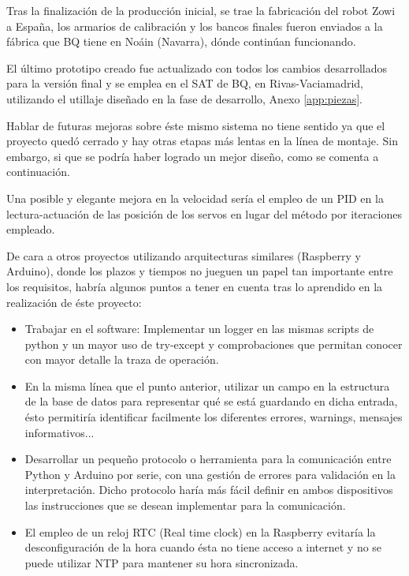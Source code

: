 Tras la finalización de la producción inicial, se trae la fabricación del robot Zowi a España, los armarios de calibración y los bancos finales fueron enviados a la fábrica que BQ tiene en Noáin (Navarra), dónde continúan funcionando.

El último prototipo creado fue actualizado con todos los cambios desarrollados para la versión final y se emplea en el SAT de BQ, en Rivas-Vaciamadrid, utilizando el utillaje diseñado en la fase de desarrollo, Anexo \ref{app:piezas}.

Hablar de futuras mejoras sobre éste mismo sistema no tiene sentido ya que el proyecto quedó cerrado y hay otras etapas más lentas en la línea de montaje. Sin embargo, si que se podría haber logrado un mejor diseño, como se comenta a continuación.

Una posible y elegante mejora en la velocidad sería el empleo de un PID en la lectura-actuación de las posición de los servos en lugar del método por iteraciones empleado.

De cara a otros proyectos utilizando arquitecturas similares (Raspberry y Arduino), donde los plazos y tiempos no jueguen un papel tan importante entre los requisitos, habría algunos puntos a tener en cuenta tras lo aprendido en la realización de éste proyecto:

\begin{itemize}
  \item Trabajar en el software: Implementar un logger en las mismas scripts de python y un mayor uso de try-except y comprobaciones que permitan conocer con mayor detalle la traza de operación.
  \item En la misma línea que el punto anterior, utilizar un campo en la estructura de la base de datos para representar qué se está guardando en dicha entrada, ésto permitiría identificar facilmente los diferentes errores, warnings, mensajes informativos...
  \item Desarrollar un pequeño protocolo o herramienta para la comunicación entre Python y Arduino por serie, con una gestión de errores para validación en la interpretación. Dicho protocolo haría más fácil definir en ambos dispositivos las instrucciones que se desean implementar para la comunicación.
  \item El empleo de un reloj RTC (Real time clock) en la Raspberry evitaría la desconfiguración de la hora cuando ésta no tiene acceso a internet y no se puede utilizar NTP para mantener su hora sincronizada.
\end{itemize}
